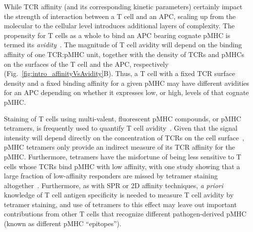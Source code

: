 While TCR affinity (and its corresponding kinetic parameters) certainly impact the strength of interaction between a T cell and an APC, scaling up from the molecular to the cellular level introduces additional layers of complexity. The propensity for T cells as a whole to bind an APC bearing cognate pMHC is termed its \textit{avidity}~\cite{this2021strength}. The magnitude of T cell avidity will depend on the binding affinity of one TCR:pMHC unit, together with the density of TCRs and pMHCs on the surfaces of the T cell and the APC, respectively (Fig.~\ref{fig:intro_affinityVsAvidity}B). Thus, a T cell with a fixed TCR surface density and a fixed binding affinity for a given pMHC may have different avidities for an APC depending on whether it expresses low, or high, levels of that cognate pMHC.

Staining of T cells using multi-valent, fluorescent pMHC compounds, or pMHC tetramers, is frequently used to quantify T cell avidity~\cite{christophersen2020peptide}. Given that the signal intensity will depend directly on the concentration of TCRs on the cell surface~\cite{christophersen2020peptide,wooldridge2009tricks}, pMHC tetramers only provide an indirect measure of its TCR affinity for the pMHC. Furthermore, tetramers have the misfortune of being less sensitive to T cells whose TCRs bind pMHC with low affinity, with one study showing that a large fraction of low-affinity responders are missed by tetramer staining altogether~\cite{andargachew2018cd4}. Furthermore, as with SPR or 2D affinity techniques, \textit{a priori} knowledge of T cell antigen specificity is needed to measure T cell avidity by tetramer staining, and use of tetramers to this effect may leave out important contributions from other T cells that recognize different pathogen-derived pMHC (known as different pMHC ``epitopes'').

